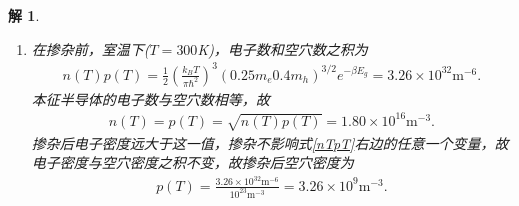 \documentclass[UTF8,10pt,a4paper]{article}
\theoremstyle{Problem}
\theoremstyle{Solution}
\newtheorem*{sol}{解}
\begin{document}
\begin{sol}
\begin{enumerate}
        (ii) 对于受主掺杂的情况，半导体中空穴多于电子，
        \begin{align}
            \frac{n(T)}{p(T)}<1.
        \end{align}
        这导致在低温下（$T\rightarrow 0$），
        \begin{align}
            \mu<\frac{\varepsilon_c+\varepsilon_v}{2}.
        \end{align}
        \item[(c)] 在掺杂前，室温下($T=300$K)，电子数和空穴数之积为
        \begin{align}
            n(T)p(T)=\frac{1}{2}\left(\frac{k_BT}{\pi\hbar^2}\right)^3(0.25m_e0.4m_h)^{3/2}e^{-\beta E_g}=3.26\times 10^{32}\text{m}^{-6}.
        \end{align}
        本征半导体的电子数与空穴数相等，故
        \begin{align}
            n(T)=p(T)=\sqrt{n(T)p(T)}=1.80\times 10^{16}\text{m}^{-3}.
        \end{align}
        掺杂后电子密度远大于这一值，掺杂不影响式\eqref{nTpT}右边的任意一个变量，故电子密度与空穴密度之积不变，故掺杂后空穴密度为
        \begin{align}
            p(T)=\frac{3.26\times 10^{32}\text{m}^{-6}}{10^{23}\text{m}^{-3}}=3.26\times 10^9\text{m}^{-3}.
        \end{align}
    \end{enumerate}
\end{sol}
\end{document}
